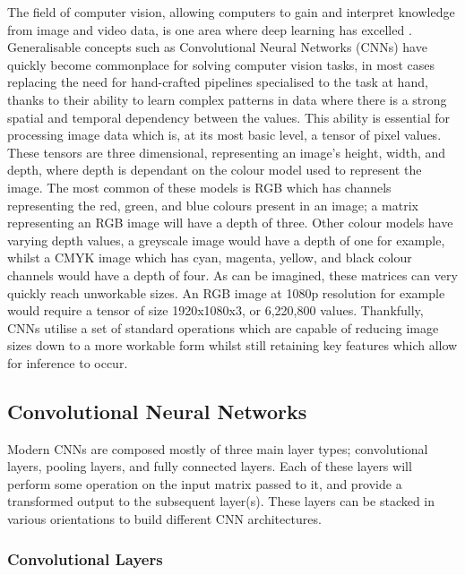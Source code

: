 The field of computer vision, allowing computers to gain and interpret knowledge from image and video data, is one area where deep learning has excelled \cite{voulodimos_deep_2018}. Generalisable concepts such as Convolutional Neural Networks (CNNs) have quickly become commonplace for solving computer vision tasks, in most cases replacing the need for hand-crafted pipelines specialised to the task at hand, thanks to their ability to learn complex patterns in data where there is a strong spatial and temporal dependency between the values. This ability is essential for processing image data which is, at its most basic level, a tensor of pixel values. These tensors are three dimensional, representing an image's height, width, and depth, where depth is dependant on the colour model used to represent the image. The most common of these models is RGB which has channels representing the red, green, and blue colours present in an image; a matrix representing an RGB image will have a depth of three. Other colour models have varying depth values, a greyscale image would have a depth of one for example, whilst a CMYK image which has cyan, magenta, yellow, and black colour channels would have a depth of four. As can be imagined, these matrices can very quickly reach unworkable sizes. An RGB image at 1080p resolution for example would require a tensor of size 1920x1080x3, or 6,220,800 values. Thankfully, CNNs utilise a set of standard operations which are capable of reducing image sizes down to a more workable form whilst still retaining key features which allow for inference to occur. 

\subsection{Convolutional Neural Networks}\label{ch:Background,sec:CNN,sub:CNN}
Modern CNNs are composed mostly of three main layer types; convolutional layers, pooling layers, and fully connected layers. Each of these layers will perform some operation on the input matrix passed to it, and provide a transformed output to the subsequent layer(s). These layers can be stacked in various orientations to build different CNN architectures.

\subsubsection{Convolutional Layers}\label{ch:Background,sec:CNN,sub:CNN,subsub:convolution}

